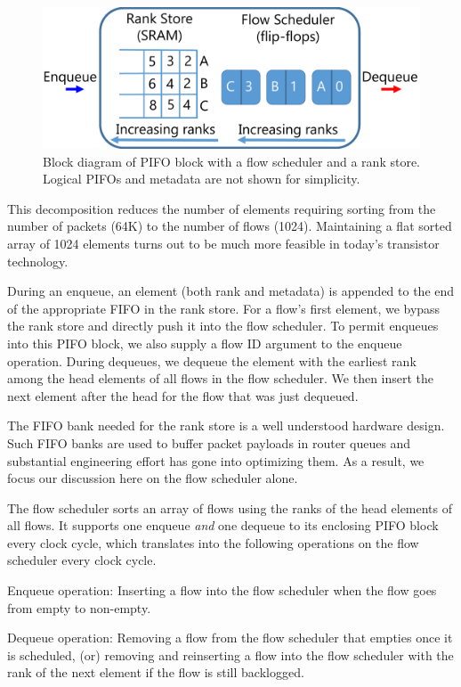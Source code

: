 \begin{figure}[!t]
  \centering
  \includegraphics[width=0.6\columnwidth]{pifo_pifo_impl.pdf}
  \caption{Block diagram of PIFO block with a flow scheduler and a
   rank store. Logical PIFOs and metadata are not shown for simplicity.}
  \label{fig:pifo_impl}
\end{figure}

This decomposition reduces the number of elements requiring sorting from the
number of packets (64K) to the number of flows (1024). Maintaining a flat
sorted array of 1024 elements turns out to be much more feasible in today's
transistor technology.

During an enqueue, an element (both rank and metadata) is appended to the end
of the appropriate FIFO in the rank store. For a flow's first element, we
bypass the rank store and directly push it into the flow scheduler. To permit
enqueues into this PIFO block, we also supply a flow ID argument to the enqueue
operation. During dequeues, we dequeue the element with the earliest rank among
the head elements of all flows in the flow scheduler.  We then insert the next
element after the head for the flow that was just dequeued.

The FIFO bank needed for the rank store is a well understood hardware design.
Such FIFO banks are used to buffer packet payloads in router queues and
substantial engineering effort has gone into optimizing them.  As a result, we
focus our discussion here on the flow scheduler alone.

The flow scheduler sorts an array of flows using the ranks of the head elements
of all flows. It supports one enqueue {\em and} one dequeue to its enclosing
PIFO block every clock cycle, which translates into the following operations on
the flow scheduler every clock cycle.
\begin{CompactEnumerate}
  \item Enqueue operation: Inserting a flow into the flow scheduler 
  when the flow goes from empty to non-empty.
\item Dequeue operation: Removing a flow from the flow scheduler that empties
once it is scheduled, (or) removing and reinserting a flow into the flow
scheduler with the rank of the next element if the flow is still backlogged.
\end{CompactEnumerate}

